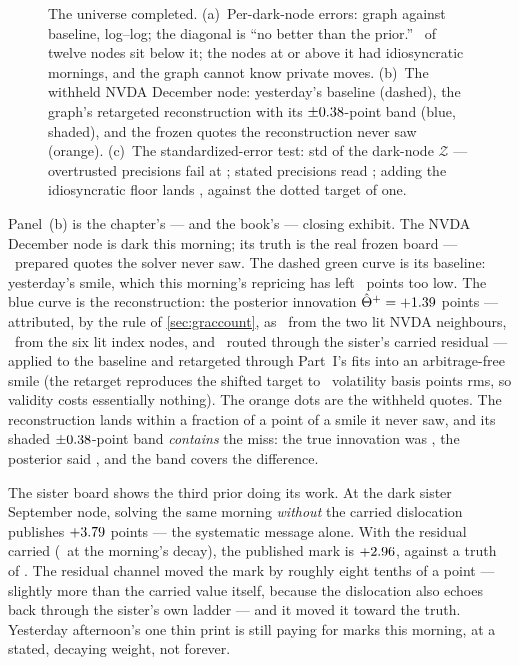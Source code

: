 \begin{figure}[htbp]
\centering
{}
\caption{The universe completed.  (a)~Per-dark-node errors: graph
against baseline, log--log; the diagonal is ``no better than the
prior.''  \MacGrSkillBetter\ of twelve nodes sit below it; the nodes at or
above it had idiosyncratic mornings, and the graph cannot know
private moves.
(b)~The withheld NVDA December node: yesterday's baseline (dashed),
the graph's retargeted reconstruction with its
$\pm0.38$-point band (blue, shaded), and the frozen
quotes the reconstruction never saw (orange).  (c)~The
standardized-error test: std of
the dark-node $\mathcal{Z}$ --- overtrusted precisions fail at
\MacGrAuditOver; stated precisions read \MacGrAuditStated; adding the
idiosyncratic floor lands \MacGrAuditFloor, against the dotted target
of one.}
\label{fig:grcomplete}
\end{figure}

Panel~(b) is the chapter's --- and the book's --- closing exhibit.  The
NVDA December node is dark this morning; its truth is the real frozen
board --- \MacGrNvdaDecQuotes\ prepared quotes the solver never saw.  The dashed
green curve is its baseline: yesterday's smile, which this morning's
repricing has left \MacGrNvdaDecTrue\ points too low.  The blue curve
is the reconstruction: the posterior innovation
$\hat\Theta^{+}=+1.39$ points --- attributed, by the
rule of \cref{sec:graccount}, as
\MacGrNvdaDecFromNvda\ from the two lit NVDA neighbours,
\MacGrNvdaDecFromSpy\ from the six lit index nodes, and
\MacGrNvdaDecFromRes\ routed through the sister's carried residual ---
applied to the baseline and retargeted through Part~I's fits
into an arbitrage-free smile (the retarget reproduces the shifted
target to \MacGrRetargetRmsBp\ volatility basis points rms, so
validity costs essentially nothing).  The orange dots are the withheld
quotes.  The reconstruction lands within a fraction of a point of a
smile it never saw, and its
shaded $\pm0.38$-point band \emph{contains} the miss:
the true innovation was \MacGrNvdaDecTrue, the posterior said
\MacGrNvdaDecPost, and the band covers the difference.

The sister board shows the third prior doing its work.  At the dark
sister September node, solving the same morning \emph{without} the
carried dislocation publishes $+3.79$ points --- the
systematic message alone.  With the residual carried
(\MacGrSisterCarried\ at the morning's decay), the published mark is
$+2.96$, against a truth of \MacGrSisterSepTrue.  The
residual channel moved the mark by roughly eight tenths of a point
--- slightly more than the carried value itself, because the
dislocation also echoes back through the sister's own ladder --- and
it moved it toward the truth.  Yesterday afternoon's one thin print is still
paying for marks this morning, at a stated, decaying weight, not
forever.

